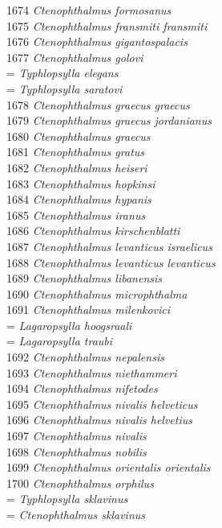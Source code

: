 \documentclass[
]{article}
\begin{document}
1674 \emph{Ctenophthalmus formosanus}\\
1675 \emph{Ctenophthalmus fransmiti fransmiti}\\
1676 \emph{Ctenophthalmus gigantospalacis}\\
1677 \emph{Ctenophthalmus golovi}\\
= \emph{Typhlopsylla elegans}\\
= \emph{Typhlopsylla saratovi}\\
1678 \emph{Ctenophthalmus graecus graecus}\\
1679 \emph{Ctenophthalmus graecus jordanianus}\\
1680 \emph{Ctenophthalmus graecus}\\
1681 \emph{Ctenophthalmus gratus}\\
1682 \emph{Ctenophthalmus heiseri}\\
1683 \emph{Ctenophthalmus hopkinsi}\\
1684 \emph{Ctenophthalmus hypanis}\\
1685 \emph{Ctenophthalmus iranus}\\
1686 \emph{Ctenophthalmus kirschenblatti}\\
1687 \emph{Ctenophthalmus levanticus israelicus}\\
1688 \emph{Ctenophthalmus levanticus levanticus}\\
1689 \emph{Ctenophthalmus libanensis}\\
1690 \emph{Ctenophthalmus microphthalma}\\
1691 \emph{Ctenophthalmus milenkovici}\\
= \emph{Lagaropsylla hoogsraali}\\
= \emph{Lagaropsylla traubi}\\
1692 \emph{Ctenophthalmus nepalensis}\\
1693 \emph{Ctenophthalmus niethammeri}\\
1694 \emph{Ctenophthalmus nifetodes}\\
1695 \emph{Ctenophthalmus nivalis helveticus}\\
1696 \emph{Ctenophthalmus nivalis helvetius}\\
1697 \emph{Ctenophthalmus nivalis}\\
1698 \emph{Ctenophthalmus nobilis}\\
1699 \emph{Ctenophthalmus orientalis orientalis}\\
1700 \emph{Ctenophthalmus orphilus}\\
= \emph{Typhlopsylla sklavinus}\\
= \emph{Ctenophthalmus sklavinus}\\
\end{document}
